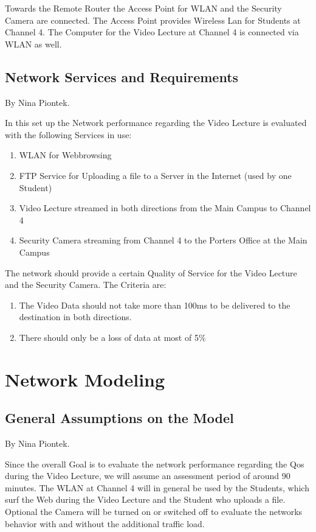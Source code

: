 \documentclass[a4paper,10pt]{book}\usepackage{graphicx}
\begin{document}
Towards the Remote Router the Access Point for WLAN and the Security Camera are connected.
The Access Point provides Wireless Lan for Students at Channel 4. The Computer for the Video Lecture at Channel 4 
is connected via WLAN as well.



\section{Network Services and Requirements}
By Nina Piontek.

In this set up the Network performance regarding the Video Lecture is evaluated with the following Services in
use:\\
\begin{enumerate}
 \item WLAN for Webbrowsing
 \item FTP Service for Uploading a file to a Server in the Internet (used by one Student) 
 \item Video Lecture streamed in both directions from the Main Campus to Channel 4
 \item Security Camera streaming from Channel 4 to the Porters Office  at the Main Campus
\end{enumerate}

The network should provide a certain Quality of Service for the Video Lecture and the Security Camera.
The Criteria are:\\
\begin{enumerate}
 \item The Video Data should not take more than 100ms to be delivered to the destination in both directions.
 \item There should only be a loss of data at most of 5$ \% $
\end{enumerate}

\chapter{Network Modeling}
\section{General Assumptions on the Model}
By Nina Piontek.

Since the overall Goal is to evaluate the network performance regarding the Qos during the Video Lecture, we will assume an assessment period
of around 90 minutes. The WLAN at Channel 4 will in general be used by the Students, which surf the Web during the Video Lecture and the Student 
who uploads a file. Optional the Camera will be turned on or switched off to evaluate the networks behavior with and without the additional
traffic load.
\end{document}
